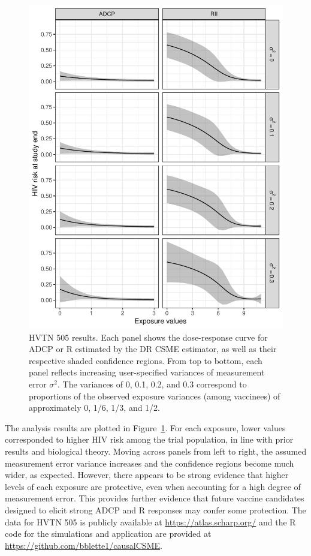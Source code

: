 \documentclass[useAMS,usenatbib,referee]{biom}
\newcommand{\RNum}[1]{\uppercase\expandafter{\romannumeral #1\relax}}
\begin{document}
\begin{figure}[h!]
\centering
\includegraphics[width=5.6in]{fig3.pdf}
\caption{HVTN 505 results. Each panel shows the dose-response curve for ADCP or R\RNum{2} estimated by the DR CSME estimator, as well as their respective shaded confidence regions. From top to bottom, each panel reflects increasing user-specified variances of measurement error $\sigma^{2}$. The variances of 0, 0.1, 0.2, and 0.3 correspond to proportions of the observed exposure variances (among vaccinees) of approximately 0, 1/6, 1/3, and 1/2.}
\label{fig:three}
\end{figure}

The analysis results are plotted in Figure~\ref{fig:three}. For each exposure, lower values corresponded to higher HIV risk among the trial population, in line with prior results and biological theory. Moving across panels from left to right, the assumed measurement error variance increases and the confidence regions become much wider, as expected. However, there appears to be strong evidence that higher levels of each exposure are protective, even when accounting for a high degree of measurement error. This provides further evidence that future vaccine candidates designed to elicit strong ADCP and R\RNum{2} responses may confer some protection. The data for HVTN 505 is publicly available at \href{https://atlas.scharp.org/cpas/project/HVTN\%20Public\%20Data/HVTN\%20505/begin.view?}{https://atlas.scharp.org/} and the R code for the simulations and application are provided at \href{https://github.com/bblette1/causalCSME}{https://github.com/bblette1/causalCSME}.
\end{document}
